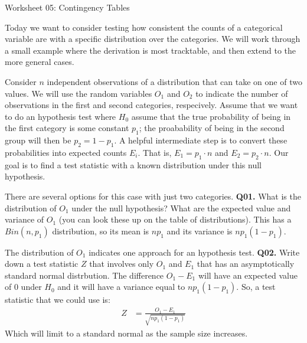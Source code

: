 \documentclass[12pt]{article}
\newcommand{\cblack}{\color{Black}}
\newcommand{\cblue}{\color{MidnightBlue}}
\begin{document}
{\large Worksheet 05: Contingency Tables}

\vspace*{18pt}
Today we want to consider testing how consistent the counts of a
categorical variable are with a specific distribution over the
categories. We will work through a small example where the derivation
is most tracktable, and then extend to the more general cases.

Consider $n$ independent observations of a distribution that can
take on one of two values. We will use the random variables $O_1$ and
$O_2$ to indicate the number of observations in the first and second
categories, respecively. Assume that we want to do an hypothesis
test where $H_0$ assume that the true probability of being in the
first category is some constant $p_1$; the proabability of being
in the second group will then be $p_2 = 1 - p_1$. A helpful
intermediate step is to convert these probabilities into expected
counts $E_i$. That is, $E_1 = p_1 \cdot n$ and $E_2 = p_2 \cdot n$.
Our goal is to find a test statistic with a known distribution under
this null hypothesis.

There are several options for this case with just two categories.
\textbf{Q01.} What is the distribution of $O_1$ under the null hypothesis?
What are the expected value and variance of $O_1$ (you can look these up
on the table of distributions). \cblue This has a $Bin(n, p_1)$ distribution,
so its mean is $n p_1$ and its variance is $n p_1 (1 - p_1)$. \cblack 

The distribution of $O_1$ indicates one approach for an hypothesis test.
\textbf{Q02.} Write down a test statistic $Z$ that involves only $O_1$
and $E_1$ that has an asymptotically standard normal distrbution. \cblue
The difference $O_1 - E_1$ will have an expected value of $0$ under
$H_0$ and it will have a variance equal to $n p_1 (1 - p_1)$. So, a
test statistic that we could use is:
\begin{align*}
Z &= \frac{O_1 - E_1}{\sqrt{n p_1 (1 - p_1)}}
\end{align*}
Which will limit to a standard normal as the sample size increases. \cblack 
\end{document}
